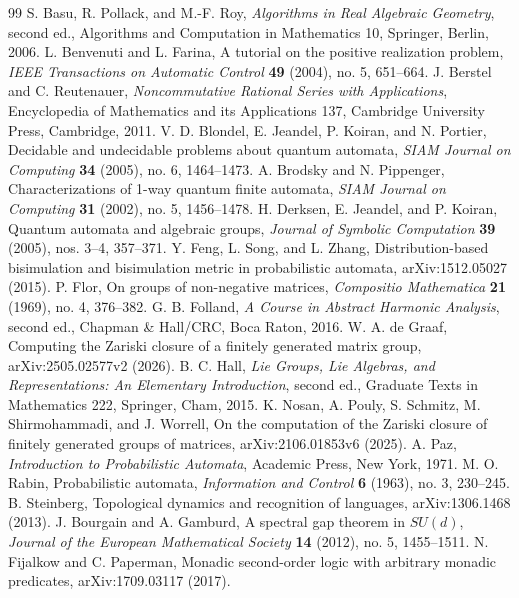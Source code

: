 \begin{thebibliography}{99}
 S. Basu, R. Pollack, and M.-F. Roy, \emph{Algorithms in Real Algebraic Geometry}, second ed., Algorithms and Computation in Mathematics 10, Springer, Berlin, 2006.
 L. Benvenuti and L. Farina, A tutorial on the positive realization problem, \emph{IEEE Transactions on Automatic Control} \textbf{49} (2004), no. 5, 651--664.
 J. Berstel and C. Reutenauer, \emph{Noncommutative Rational Series with Applications}, Encyclopedia of Mathematics and its Applications 137, Cambridge University Press, Cambridge, 2011.
 V. D. Blondel, E. Jeandel, P. Koiran, and N. Portier, Decidable and undecidable problems about quantum automata, \emph{SIAM Journal on Computing} \textbf{34} (2005), no. 6, 1464--1473.
 A. Brodsky and N. Pippenger, Characterizations of 1-way quantum finite automata, \emph{SIAM Journal on Computing} \textbf{31} (2002), no. 5, 1456--1478.
 H. Derksen, E. Jeandel, and P. Koiran, Quantum automata and algebraic groups, \emph{Journal of Symbolic Computation} \textbf{39} (2005), nos. 3--4, 357--371.
 Y. Feng, L. Song, and L. Zhang, Distribution-based bisimulation and bisimulation metric in probabilistic automata, arXiv:1512.05027 (2015).
 P. Flor, On groups of non-negative matrices, \emph{Compositio Mathematica} \textbf{21} (1969), no. 4, 376--382.
 G. B. Folland, \emph{A Course in Abstract Harmonic Analysis}, second ed., Chapman \& Hall/CRC, Boca Raton, 2016.
 W. A. de Graaf, Computing the Zariski closure of a finitely generated matrix group, arXiv:2505.02577v2 (2026).
 B. C. Hall, \emph{Lie Groups, Lie Algebras, and Representations: An Elementary Introduction}, second ed., Graduate Texts in Mathematics 222, Springer, Cham, 2015.
 K. Nosan, A. Pouly, S. Schmitz, M. Shirmohammadi, and J. Worrell, On the computation of the Zariski closure of finitely generated groups of matrices, arXiv:2106.01853v6 (2025).
 A. Paz, \emph{Introduction to Probabilistic Automata}, Academic Press, New York, 1971.
 M. O. Rabin, Probabilistic automata, \emph{Information and Control} \textbf{6} (1963), no. 3, 230--245.
 B. Steinberg, Topological dynamics and recognition of languages, arXiv:1306.1468 (2013).
 J. Bourgain and A. Gamburd, A spectral gap theorem in $SU(d)$, \emph{Journal of the European Mathematical Society} \textbf{14} (2012), no. 5, 1455--1511.
 N. Fijalkow and C. Paperman, Monadic second-order logic with arbitrary monadic predicates, arXiv:1709.03117 (2017).

\end{thebibliography}
